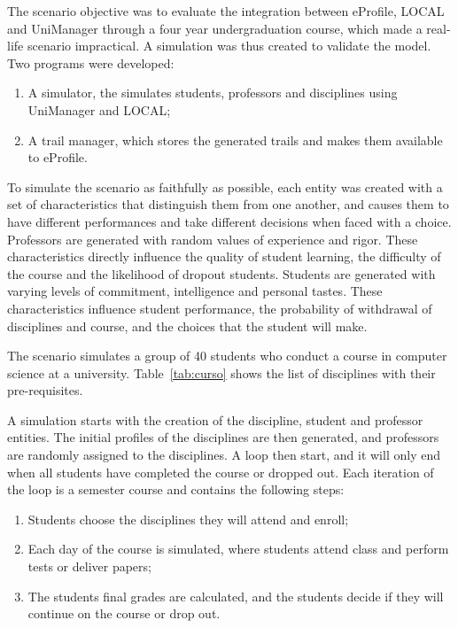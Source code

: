 \documentclass{svjour3}                     %
\begin{document}
The scenario objective was to evaluate the integration between eProfile, LOCAL and UniManager through a four year undergraduation course, which made a real-life scenario impractical. A simulation was thus created to validate the model. Two programs were developed:

\begin{enumerate}
  \item A simulator, the simulates students, professors and disciplines using UniManager and LOCAL;
  \item A trail manager, which stores the generated trails and makes them available to eProfile.
\end{enumerate}

To simulate the scenario as faithfully as possible, each entity was created with a set of characteristics that distinguish them from one another, and causes them to have different performances and take different decisions when faced with a choice. Professors are generated with random values of experience and rigor. These characteristics directly influence the quality of student learning, the difficulty of the course and the likelihood of dropout students. Students are generated with varying levels of commitment, intelligence and personal tastes. These characteristics influence student performance, the probability of withdrawal of disciplines and course, and the choices that the student will make.

The scenario simulates a group of 40 students who conduct a course in computer science at a university. Table~\ref{tab:curso} shows the list of disciplines with their pre-requisites.

A simulation starts with the creation of the discipline, student and professor entities. The initial profiles of the disciplines are then generated, and professors are randomly assigned to the disciplines. A loop then start, and it will only end when all students have completed the course or dropped out. Each iteration of the loop is a semester course and contains the following steps:

\begin{enumerate}
\item Students choose the disciplines they will attend and enroll;
\item Each day of the course is simulated, where students attend class and perform tests or deliver papers;
\item The students final grades are calculated, and the students decide if they will continue on the course or drop out.
\end{enumerate}
\end{document}
